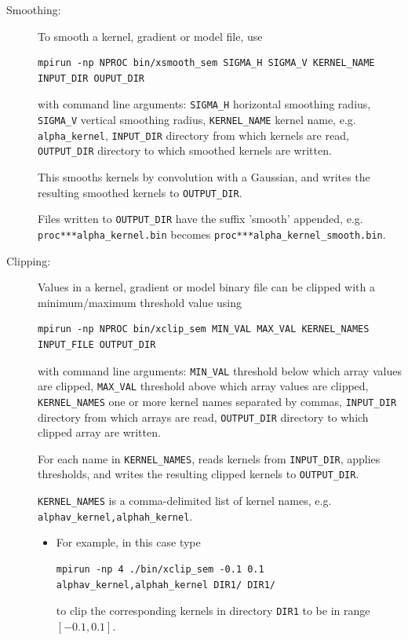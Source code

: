 \begin{description}
\item [Smoothing:] To smooth a kernel, gradient or model file, use
\begin{verbatim}
mpirun -np NPROC bin/xsmooth_sem SIGMA_H SIGMA_V KERNEL_NAME INPUT_DIR OUPUT_DIR
\end{verbatim}
with command line arguments:
\texttt{SIGMA\_H} horizontal smoothing radius,
\texttt{SIGMA\_V} vertical smoothing radius,
\texttt{KERNEL\_NAME} kernel name, e.g. \texttt{alpha\_kernel},
\texttt{INPUT\_DIR} directory from which kernels are read,
\texttt{OUTPUT\_DIR} directory to which smoothed kernels are written.\newline


This smooths kernels by convolution with a Gaussian, and writes the resulting
smoothed kernels to \texttt{OUTPUT\_DIR}.\newline

Files written to \texttt{OUTPUT\_DIR} have the suffix 'smooth' appended,
e.g. \texttt{proc***alpha\_kernel.bin} becomes \texttt{proc***alpha\_kernel\_smooth.bin}.

\item [Clipping:] Values in a kernel, gradient or model binary file can be clipped with a minimum/maximum threshold value using
\begin{verbatim}
mpirun -np NPROC bin/xclip_sem MIN_VAL MAX_VAL KERNEL_NAMES INPUT_FILE OUTPUT_DIR
\end{verbatim}
with command line arguments:
\texttt{MIN\_VAL} threshold below which array values are clipped,
\texttt{MAX\_VAL} threshold above which array values are clipped,
\texttt{KERNEL\_NAMES} one or more kernel names separated by commas,
\texttt{INPUT\_DIR} directory from which arrays are read,
\texttt{OUTPUT\_DIR} directory to which clipped array are written.\newline

For each name in \texttt{KERNEL\_NAMES}, reads kernels from \texttt{INPUT\_DIR}, applies
thresholds, and writes the resulting clipped kernels to \texttt{OUTPUT\_DIR}.\newline

\texttt{KERNEL\_NAMES} is a comma-delimited list of kernel names,
e.g. \texttt{alphav\_kernel,alphah\_kernel}.
\begin{itemize}
\item [] For example, in this case type
{\small
\begin{verbatim}
mpirun -np 4 ./bin/xclip_sem -0.1 0.1 alphav_kernel,alphah_kernel DIR1/ DIR1/
\end{verbatim}
}
to clip the corresponding kernels in directory \texttt{DIR1} to be in range $[-0.1,0.1]$.
\end{itemize}


\end{description}
